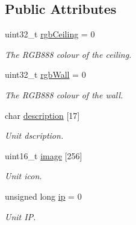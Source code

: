 \subsection*{Public Attributes}
\begin{DoxyCompactItemize}
\item 
\mbox{\label{classLightUnit_ae688f610193b69a2f390bd2a44dc2a7c}} 
uint32\+\_\+t \mbox{\hyperlink{classLightUnit_ae688f610193b69a2f390bd2a44dc2a7c}{rgb\+Ceiling}} = 0
\begin{DoxyCompactList}\small\item\em The R\+G\+B888 colour of the ceiling. \end{DoxyCompactList}\item 
\mbox{\label{classLightUnit_a9927e4bcf968e043883688e87935fb4a}} 
uint32\+\_\+t \mbox{\hyperlink{classLightUnit_a9927e4bcf968e043883688e87935fb4a}{rgb\+Wall}} = 0
\begin{DoxyCompactList}\small\item\em The R\+G\+B888 colour of the wall. \end{DoxyCompactList}\item 
\mbox{\label{classLightUnit_aad36ad5ba65b93a30ee35ef1f6895b5a}} 
char \mbox{\hyperlink{classLightUnit_aad36ad5ba65b93a30ee35ef1f6895b5a}{description}} \mbox{[}17\mbox{]}
\begin{DoxyCompactList}\small\item\em Unit dscription. \end{DoxyCompactList}\item 
\mbox{\label{classLightUnit_a01f65fda0c55ecd8b1d62911cfa688d2}} 
uint16\+\_\+t \mbox{\hyperlink{classLightUnit_a01f65fda0c55ecd8b1d62911cfa688d2}{image}} \mbox{[}256\mbox{]}
\begin{DoxyCompactList}\small\item\em Unit icon. \end{DoxyCompactList}\item 
\mbox{\label{classLightUnit_a7d490bbccb134d200628eee46ab8fb3d}} 
unsigned long \mbox{\hyperlink{classLightUnit_a7d490bbccb134d200628eee46ab8fb3d}{ip}} = 0
\begin{DoxyCompactList}\small\item\em Unit IP. \end{DoxyCompactList}\item 

\end{DoxyCompactItemize}
